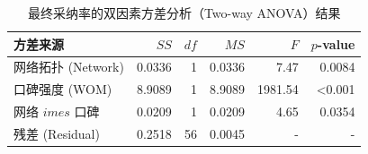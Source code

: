 \begin{table}[H]
    \centering
    \caption{最终采纳率的双因素方差分析（Two-way ANOVA）结果}
    \label{tab:anova}
    \begin{tabular}{lrrrrr}
        \toprule
        方差来源 & $SS$ & $df$ & $MS$ & $F$ & $p$-value \\
        \midrule
        网络拓扑 (Network) & 0.0336 & 1 & 0.0336 & 7.47 & 0.0084 \\
        口碑强度 (WOM) & 8.9089 & 1 & 8.9089 & 1981.54 & <0.001 \\
        网络 $	imes$ 口碑 & 0.0209 & 1 & 0.0209 & 4.65 & 0.0354 \\
        残差 (Residual) & 0.2518 & 56 & 0.0045 & - & - \\
        \bottomrule
    \end{tabular}
\end{table}